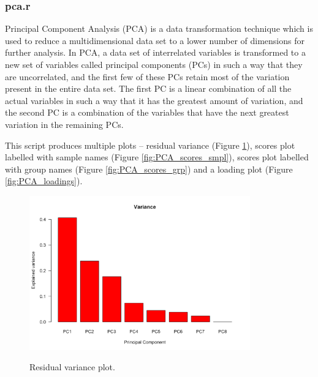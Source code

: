 \documentclass[english,a4paper,12pt]{article}
\begin{document}
\subsubsection*{pca.r}
Principal Component Analysis (PCA) is a data transformation technique which is used to reduce a multidimensional data set to a lower number of dimensions for further analysis. In PCA, a data set of interrelated variables is transformed to a new set of variables called principal components (PCs) in such a way that they are uncorrelated, and the first few of these PCs retain most of the variation present in the entire data set. The first PC is a linear combination of all the actual variables in such a way that it has the greatest amount of variation, and the second PC is a combination of the variables that have the next greatest variation in the remaining PCs.

This script produces multiple plots -- residual variance (Figure \ref{fig:PCA_variance}), scores plot labelled with sample names (Figure \ref{fig:PCA_scores_smpl}), scores plot labelled with group names (Figure \ref{fig:PCA_scores_grp}) and a loading plot (Figure \ref{fig:PCA_loadings}).

\begin{figure}[!hp]
    \centering
    \includegraphics[width=0.85\textwidth]{images/PCA_variance.png} \\
    \caption[PCA - Variance]{Residual variance plot.}
    \label{fig:PCA_variance}
\end{figure}
\end{document}
